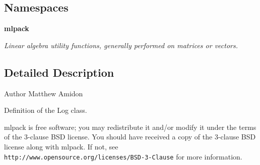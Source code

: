 \subsection*{Namespaces}
\begin{DoxyCompactItemize}
\item 
 {\bf mlpack}
\begin{DoxyCompactList}\small\item\em Linear algebra utility functions, generally performed on matrices or vectors. \end{DoxyCompactList}\end{DoxyCompactItemize}


\subsection{Detailed Description}
\begin{DoxyAuthor}{Author}
Matthew Amidon
\end{DoxyAuthor}
Definition of the Log class.

mlpack is free software; you may redistribute it and/or modify it under the terms of the 3-\/clause B\+SD license. You should have received a copy of the 3-\/clause B\+SD license along with mlpack. If not, see {\tt http\+://www.\+opensource.\+org/licenses/\+B\+S\+D-\/3-\/\+Clause} for more information. 